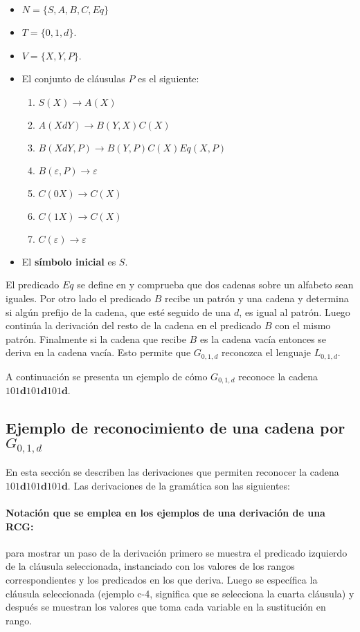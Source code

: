 \begin{itemize}
    \item $N=\{S,A,B,C,Eq\}$
    \item $T=\{0,1,d\}$.
    \item $V=\{X,Y,P\}$.
    \item El conjunto de cláusulas $P$ es el siguiente:
          \begin{enumerate}
              \item $S(X)\to A(X)$
              \item $A(XdY)\to B(Y,X)C(X)$
              \item $B(XdY,P)\to B(Y,P) C(X) Eq(X,P)$
              \item $B(\varepsilon,P)\to \varepsilon$
              \item $C(0X)\to C(X)$
              \item $C(1X)\to C(X)$
              \item $C(\varepsilon)\to \varepsilon$
          \end{enumerate}
    \item El \textbf{símbolo inicial} es $S$.
\end{itemize}

El predicado $Eq$ se define en \cite{mainRCGBib} y comprueba que dos cadenas sobre un alfabeto sean iguales.
Por otro lado el predicado $B$ recibe un patrón y una cadena y determina si algún prefijo de la cadena,
que esté seguido de una $d$, es igual al patrón. Luego continúa la derivación del resto de la cadena en el
predicado $B$ con el mismo patrón. Finalmente si la cadena que recibe $B$ es la cadena vacía entonces se
deriva en la cadena vacía. Esto permite que $G_{0,1,d}$ reconozca el lenguaje $L_{0,1,d}$.

A continuación se presenta un ejemplo de cómo $G_{0,1,d}$ reconoce la cadena $101\mathbf{d}101\mathbf{d}101\mathbf{d}$.

\subsection{Ejemplo de reconocimiento de una cadena por $G_{0,1,d}$}

En esta sección se describen las derivaciones que permiten reconocer la cadena $101\mathbf{d}101\mathbf{d}101\mathbf{d}$. Las derivaciones
de la gramática son las siguientes:

\paragraph{Notación que se emplea en los ejemplos de una derivación de una RCG:} para mostrar un paso de la
derivación primero se muestra el predicado izquierdo de la cláusula seleccionada, instanciado con los valores
de los rangos correspondientes y los predicados en los que deriva. Luego se específica la cláusula seleccionada
(ejemplo c-4, significa que se selecciona la cuarta cláusula) y después se muestran los valores que toma cada
variable en la sustitución en rango.

